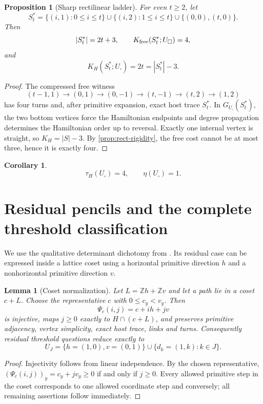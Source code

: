 \documentclass[11pt]{article}
\newtheorem{proposition}[theorem]{Proposition}
\newtheorem{lemma}[theorem]{Lemma}
\newtheorem{corollary}[theorem]{Corollary}
\theoremstyle{definition}
\newcommand{\Z}{\mathbb Z}
\begin{document}
\begin{proposition}[Sharp rectilinear ladder]\label{prop:rect-ladder}
For even $t\ge2$, let
\[
S_t^*=\{(i,1):0\le i\le t\}\cup\{(i,2):1\le i\le t\}\cup\{(0,0),(t,0)\}.
\]
Then
\[
|S_t^*|=2t+3,\qquad K_{\rm free}(S_t^*;U_\square)=4,
\]
and
\[
K_H(S_t^*;U_\square)=2t=|S_t^*|-3.
\]
\end{proposition}
\begin{proof}
The compressed free witness
\[
(t-1,1)\to(0,1)\to(0,-1)\to(t,-1)\to(t,2)\to(1,2)
\]
has four turns and, after primitive expansion, exact host trace $S_t^*$.  In $G_{U_\square}(S_t^*)$, the two bottom vertices force the Hamiltonian endpoints and degree propagation determines the Hamiltonian order up to reversal.  Exactly one internal vertex is straight, so $K_H=|S|-3$.  By \cref{prop:rect-rigidity}, the free cost cannot be at most three, hence it is exactly four.
\end{proof}

\begin{corollary}\label{cor:rect-tau-eta}
\[
\boxed{\tau_H(U_\square)=4,\qquad \eta(U_\square)=1.}
\]
\end{corollary}

\section{Residual pencils and the complete threshold classification}\label{sec:pencils}
We use the qualitative determinant dichotomy from \cite{RosalesPaperIIII}.  Its residual case can be expressed inside a lattice coset using a horizontal primitive direction $h$ and a nonhorizontal primitive direction $v$.

\begin{lemma}[Coset normalization]\label{lem:coset}
Let $L=\Z h+\Z v$ and let a path lie in a coset $c+L$.  Choose the representative $c$ with $0\le c_y<v_y$.  Then
\[
\Psi_c(i,j)=c+ih+jv
\]
is injective, maps $j\ge0$ exactly to $H\cap(c+L)$, and preserves primitive adjacency, vertex simplicity, exact host trace, links and turns.  Consequently residual threshold questions reduce exactly to
\[
U_J=\{h=(1,0),v=(0,1)\}\cup\{d_k=(1,k):k\in J\}.
\]
\end{lemma}
\begin{proof}
Injectivity follows from linear independence.  By the chosen representative, $(\Psi_c(i,j))_y=c_y+jv_y\ge0$ if and only if $j\ge0$.  Every allowed primitive step in the coset corresponds to one allowed coordinate step and conversely; all remaining assertions follow immediately.
\end{proof}
\end{document}
